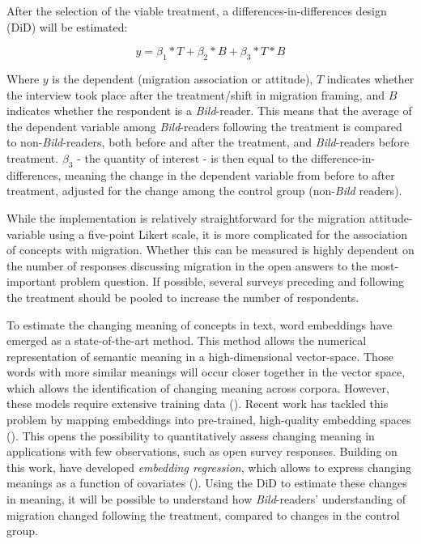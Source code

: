 \documentclass{article}
\begin{document}
After the selection of the viable treatment, a differences-in-differences design (DiD) will be estimated:

$$ y = \beta_1 * T + \beta_2 * B + \beta_3 * T * B $$

Where $y$ is the dependent (migration association or attitude), $T$ indicates whether the interview took place after the treatment/shift in migration framing, and $B$ indicates whether the respondent is a \textit{Bild}-reader. This means that the average of the dependent variable among \textit{Bild}-readers following the treatment is compared to non-\textit{Bild}-readers, both before and after the treatment, and \textit{Bild}-readers before treatment. $\beta_3$ - the quantity of interest - is then equal to the difference-in-differences, meaning the change in the dependent variable from before to after treatment, adjusted for the change among the control group (non-\textit{Bild} readers).

While the implementation is relatively straightforward for the migration attitude-variable using a five-point Likert scale, it is more complicated for the association of concepts with migration. Whether this can be measured is highly dependent on the number of responses discussing migration in the open answers to the most-important problem question. If possible, several surveys preceding and following the treatment should be pooled to increase the number of respondents. 

To estimate the changing meaning of concepts in text, word embeddings have emerged as a state-of-the-art method. This method allows the numerical representation of semantic meaning in a high-dimensional vector-space. Those words with more similar meanings will occur closer together in the vector space, which allows the identification of changing meaning across corpora. However, these models require extensive training data (\cite{Rodman2019}). Recent work has tackled this problem by mapping embeddings into pre-trained, high-quality embedding spaces (\cite{Khodak2018}). This opens the possibility to quantitatively assess changing meaning in applications with few observations, such as open survey responses. Building on this work, \citeauthor{Rodriguez2020} have developed \textit{embedding regression}, which allows to express changing meanings as a function of covariates (\citeyear{Rodriguez2020}). Using the DiD to estimate these changes in meaning, it will be possible to understand how \textit{Bild}-readers' understanding of migration changed following the treatment, compared to changes in the control group.
\end{document}
